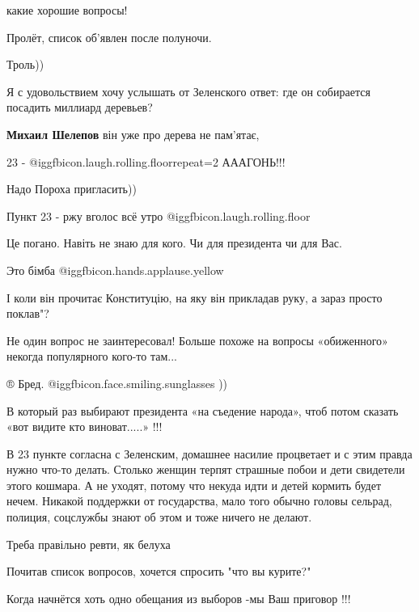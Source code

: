 \begin{itemize}
какие хорошие вопросы!

Пролёт, список об'явлен после полуночи.

Троль))

Я с удовольствием хочу услышать от Зеленского ответ: где он собирается посадить миллиард деревьев?

\begin{itemize} %
\textbf{Михаил Шелепов} він уже про дерева не пам'ятає,
\end{itemize} %

23 -  @igg{fbicon.laugh.rolling.floor}{repeat=2}  АААГОНЬ!!!

Надо Пороха пригласить))


Пункт 23 - ржу вголос всё утро @igg{fbicon.laugh.rolling.floor} 

Це погано. Навіть не знаю для кого. Чи для президента чи для Вас.

Это бімба  @igg{fbicon.hands.applause.yellow} 

І коли він прочитає Конституцію, на яку він прикладав руку, а зараз просто поклав"?

Не один вопрос не заинтересовал! Больше похоже на вопросы «обиженного» некогда популярного кого-то там...

® Бред. @igg{fbicon.face.smiling.sunglasses} ))


В который раз выбирают президента «на съедение народа», чтоб потом сказать «вот
видите кто виноват.....» !!!


В 23 пункте согласна с Зеленским, домашнее насилие процветает и с этим правда
нужно что-то делать. Столько женщин терпят страшные побои и дети свидетели
этого кошмара. А не уходят, потому что некуда идти и детей кормить будет нечем.
Никакой поддержки от государства, мало того обычно головы сельрад, полиция,
соцслужбы знают об этом и тоже ничего не делают.


Треба правільно ревти, як белуха

Почитав список вопросов, хочется спросить "что вы курите?"

Когда начнётся хоть одно обещания из выборов -мы Ваш приговор !!!


\end{itemize}

